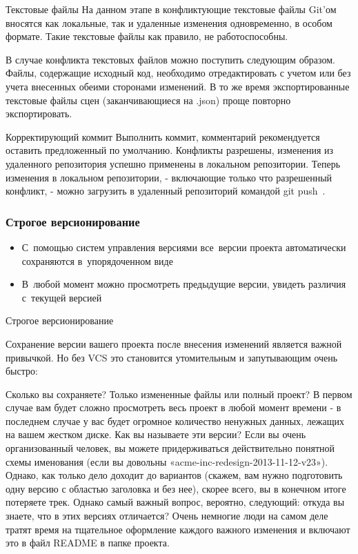 \documentclass{../industrial-development}
\begin{document}
Текстовые файлы
На данном этапе в конфликтующие текстовые файлы Git’ом вносятся как локальные, так и удаленные изменения одновременно, в особом формате. Такие текстовые файлы как правило, не работоспособны.

В случае конфликта текстовых файлов можно поступить следующим образом. Файлы, содержащие исходный код, необходимо отредактировать с учетом или без учета внесенных обеими сторонами изменений. В то же время экспортированные текстовые файлы сцен (заканчивающиеся на .json) проще повторно экспортировать.

Корректирующий коммит
Выполнить коммит, комментарий рекомендуется оставить предложенный по умолчанию.
Конфликты разрешены, изменения из удаленного репозитория успешно применены в локальном репозитории. Теперь изменения в локальном репозитории, - включающие только что разрешенный конфликт, - можно загрузить в удаленный репозиторий командой git push~\cite{Blend4web}.

\begin{frame} \frametitle{Строгое версионирование}
  \begin{itemize}
  \item С~помощью систем управления версиями все~версии проекта автоматически сохраняются в~упорядоченном виде
  \item В~любой момент можно просмотреть предыдущие версии, увидеть различия с~текущей версией
  \end{itemize}
\end{frame}

\lecturenotes

Строгое версионирование

Сохранение версии вашего проекта после внесения изменений является важной привычкой. Но без VCS это становится утомительным и запутывающим очень быстро:

    Сколько вы сохраняете? Только измененные файлы или полный проект? В первом случае вам будет сложно просмотреть весь проект в любой момент времени - в последнем случае у вас будет огромное количество ненужных данных, лежащих на вашем жестком диске.
    Как вы называете эти версии? Если вы очень организованный человек, вы можете придерживаться действительно понятной схемы именования (если вы довольны «acme-inc-redesign-2013-11-12-v23»). Однако, как только дело доходит до вариантов (скажем, вам нужно подготовить одну версию с областью заголовка и без нее), скорее всего, вы в конечном итоге потеряете трек.
    Однако самый важный вопрос, вероятно, следующий: откуда вы знаете, что в этих версиях отличается? Очень немногие люди на самом деле тратят время на тщательное оформление каждого важного изменения и включают это в файл README в папке проекта.
\end{document}

